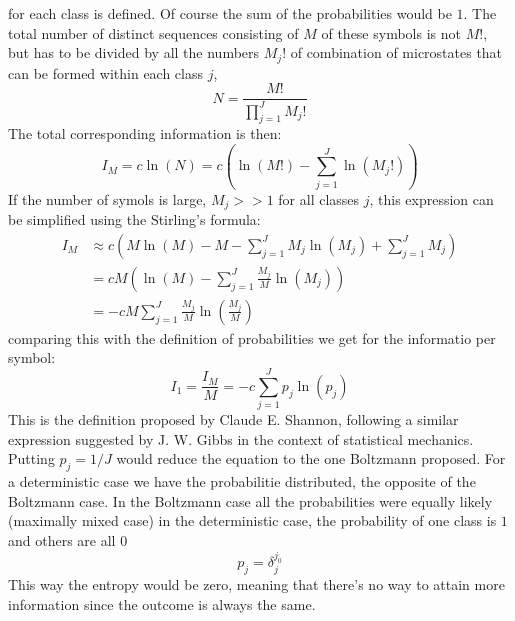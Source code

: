 \documentclass[9pt,a4paper, twocolumn]{article}
\begin{document}
            for each class is defined. Of course the sum of the probabilities would be $1$. The total number of distinct sequences consisting of $M$ of these symbols is not $M!$, but has to be divided by all the numbers $M_j!$ of combination of microstates that can be formed within each class $j$, 
            \begin{equation}
                N = \frac{M!}{\prod_{j=1}^{J}M_j!}
            \end{equation}
            The total corresponding information is then:
            \begin{equation}
                I_M = c\ln(N) = c \left(\ln(M!) - \sum_{j=1}^{J}\ln(M_j!) \right)
            \end{equation}
            If the number of symols is large, $M_j>>1$ for all classes $j$, this expression can be simplified using the Stirling's formula:
            \begin{align*}
                I_M &\approx c \left(M\ln(M) - M - \sum_{j=1}^{J}M_j\ln(M_j)+\sum_{j=1}^J M_j\right)\\
                &= cM\left(\ln(M) - \sum_{j=1}^J \frac{M_j}{M}\ln(M_j)\right)\\
                &= -cM\sum_{j=1}^J \frac{M_j}{M}\ln\left(\frac{M_j}{M}\right)
            \end{align*}
            comparing this with the definition of probabilities we get for the informatio per symbol:
            \begin{equation}
                I_1 = \frac{I_M}{M}  = - c\sum_{j=1}^J p_j\ln(p_j)
            \end{equation}
            This is the definition proposed by Claude E. Shannon, following a similar expression suggested by J. W. Gibbs in the context of statistical mechanics. Putting $p_j = 1/J$ would reduce the equation to the one Boltzmann proposed. For a deterministic case we have the probabilitie distributed, the opposite of the Boltzmann case. In the Boltzmann case all the probabilities were equally likely (maximally mixed case) in the deterministic case, the probability of one class is $1$ and others are all $0$
            \begin{equation}
                p_j = \delta_j^{j_0}
            \end{equation}
            This way the entropy would be zero, meaning that there's no way to attain more information since the outcome is always the same.
\end{document}
